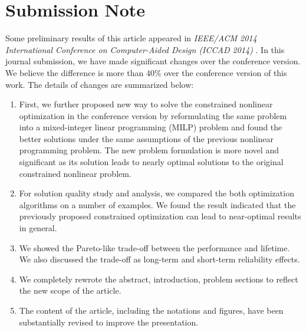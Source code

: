 %




\section{Submission Note}


Some preliminary results of this article appeared in {\it IEEE/ACM
  2014 International Conference on Computer-Aided Design (ICCAD 2014)
}\cite{paper_here}. In this journal submission, we have made
significant changes over the conference version. We believe the
difference is more than 40\% over the conference version of this
work. The details of changes are summarized below:
\begin{enumerate}

\item First, we further proposed new way to solve the constrained
  nonlinear optimization in the conference version by reformulating
  the same problem into a mixed-integer linear programming (MILP)
  problem and found the better solutions under the same assumptions of
  the previous nonlinear programming problem. The new problem
  formulation is more novel and significant as its solution leads to
  nearly optimal solutions to the original constrained nonlinear
  problem.

\item For solution quality study and analysis, we compared the both
  optimization algorithms on a number of examples. We found the result
  indicated that the previously proposed constrained optimization can
  lead to near-optimal results in general.

\item We showed the Pareto-like trade-off between the performance and
lifetime. We also discussed the trade-off as long-term and short-term
reliability effects.

\item We completely rewrote the abstract, introduction, problem
sections to reflect the new scope of the article.

\item The content of the article, including the notations and figures,
have been substantially revised to improve the presentation.


\end{enumerate}



%
